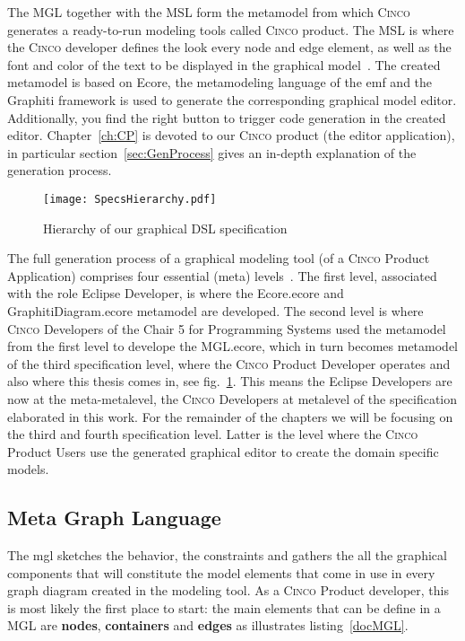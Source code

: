 The MGL together with the MSL form the metamodel from which \textsc{Cinco} generates a ready-to-run modeling tools called \textsc{Cinco} product. The MSL is where the \textsc{Cinco} developer defines the look every node and edge element, as well as the font and color of the text to be displayed in the graphical model~\cite{naujokat-diss}. The created metamodel is based on Ecore, the metamodeling language of the \gls{emf} and the Graphiti framework is used to generate the corresponding graphical model editor. Additionally, you find the right button to trigger code generation in the created editor. Chapter~\ref{ch:CP} is devoted to our \textsc{Cinco} product (the editor application), in particular section~\ref{sec:GenProcess} gives an in-depth explanation of the generation process.

\begin{figure}[h]
    \centering
    \texttt{[image: SpecsHierarchy.pdf]}
    \caption{Hierarchy of our graphical DSL specification}
    \label{fig:modeling-hierachy}
\end{figure}

The full generation process of a graphical modeling tool (of a \textsc{Cinco} Product Application) comprises four essential (meta) levels~\cite{Naujokat2018}. The first level, associated with the role Eclipse Developer, is where the Ecore.ecore and GraphitiDiagram.ecore metamodel are developed. The second level is where \textsc{Cinco} Developers of the Chair 5 for Programming Systems used the metamodel from the first level to develope the MGL.ecore, which in turn becomes metamodel of the third specification level, where the \textsc{Cinco} Product Developer operates and also where this thesis comes in, see fig.~\ref{fig:modeling-hierachy}. This means the Eclipse Developers are now at the meta-metalevel, the \textsc{Cinco} Developers at metalevel of the specification elaborated in this work. For the remainder of the chapters we will be focusing on the third and fourth specification level. Latter is the level where the \textsc{Cinco} Product Users use the generated graphical editor to create the domain specific models.

\subsection{Meta Graph Language}\label{sec:MGL}

The \gls*{mgl} sketches the behavior, the constraints and gathers the all the graphical components that will constitute the model elements that come in use in every graph diagram created in the modeling tool. As a \textsc{Cinco} Product developer, this is most likely the first place to start: the main elements that can be define in a MGL are \textbf{nodes}, \textbf{containers} and \textbf{edges} as illustrates listing~\ref{docMGL}.

